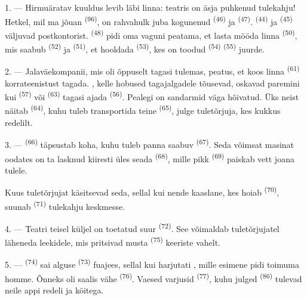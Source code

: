 \VUsaut{3.4mm}

1. --- Hirmuäratav kuuldus levib läbi linna: teatris on äsja puhkenud tulekahju!
Hetkel, mil ma jõuan  \textsuperscript{(96)}, on rahvahulk juba
kogunenud  \textsuperscript{(46)} ja 
\textsuperscript{(47)}.  \textsuperscript{(44)} ja
 \textsuperscript{(45)} väljuvad postkontorist. 
\textsuperscript{(48)} pidi oma vaguni peatama, et lasta mööda linna
 \textsuperscript{(50)}, mis saabub 
\textsuperscript{(52)} ja  \textsuperscript{(51)}, et hooldada
 \textsuperscript{(53)}, kes on toodud 
\textsuperscript{(54)}  \textsuperscript{(55)} juurde.

2. --- Jalaväekompanii, mis oli õppuselt tagasi tulemas, peatus, et koos linna
 \textsuperscript{(61)} korrateenistust tagada.
, kelle hobused tagajalgadele tõusevad, oskavad paremini kui
 \textsuperscript{(57)} või  \textsuperscript{(63)}
tagasi ajada  \textsuperscript{(56)}. Pealegi on sandarmid väga
hõivatud. Üks neist näitab  \textsuperscript{(64)}, kuhu tuleb
transportida teine  \textsuperscript{(65)}, julge tuletõrjuja, kes kukkus
redelilt.

3. ---  \textsuperscript{(66)} täpsustab koha, kuhu tuleb panna saabuv
 \textsuperscript{(67)}. Seda võimsat masinat oodates on ta lasknud
kiiresti üles seada  \textsuperscript{(68)}, mille pikk 
\textsuperscript{(69)} paiskab vett joana tulele.

Kuus tuletõrjujat käsitsevad seda, sellal kui nende kaaslane, kes hoiab 
\textsuperscript{(70)}, suunab  \textsuperscript{(71)} tulekahju keskmesse.

4. --- Teatri teisel küljel on toetatud suur  \textsuperscript{(72)}. See
võimaldab tuletõrjujatel läheneda leekidele, mis pritsivad musta 
\textsuperscript{(75)} keeriste vahelt.

\VUsaut{5.0mm}
\VUsaut{3.4mm}

5. ---  \textsuperscript{(74)} sai alguse 
\textsuperscript{(73)} fuajees, sellal kui harjutati , mille esimene
 pidi toimuma homme. Õnneks oli saalis vähe 
\textsuperscript{(76)}. Vaesed varjusid  \textsuperscript{(77)}, kuhu
julged  \textsuperscript{(86)} tulevad neile appi redeli ja
köitega.

